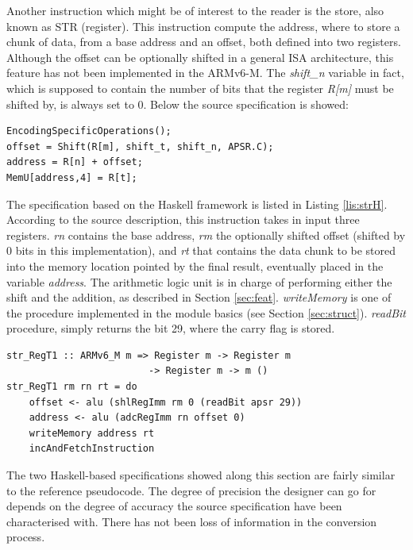 \documentclass[conference]{IEEEtran}
\begin{document}
Another instruction which might be of interest to the reader is the store, also known as STR
(register). This instruction compute the address, where to store a chunk of data, from a base
address and an offset, both defined into two registers. Although the offset can be optionally
shifted in a general ISA architecture, this feature has not been implemented in the ARMv6-M.
The \textit{shift\_n} variable in fact, which is supposed to contain the number of bits that
the register \textit{R[m]} must be shifted by, is always set to 0. Below the source
specification is showed:\\

\begin{lstlisting}[caption=STR (register) instruction - Reference specification,
frame=single, label=lis:str]
EncodingSpecificOperations();
offset = Shift(R[m], shift_t, shift_n, APSR.C);
address = R[n] + offset;
MemU[address,4] = R[t];
\end{lstlisting}

\noindent
The specification based on the Haskell framework is listed in Listing \ref{lis:strH}.
According to the source description, this instruction takes in input three registers.
\textit{rn} contains the base address, \textit{rm} the optionally shifted offset (shifted by
0 bits in this implementation), and \textit{rt} that contains the data chunk to be stored
into the memory location pointed by the final result, eventually placed in the variable
\textit{address}. The arithmetic logic unit is in charge of performing either the shift and
the addition, as described in Section \ref{sec:feat}. \textit{writeMemory} is one of the
procedure implemented in the module basics (see Section \ref{sec:struct}). \textit{readBit}
procedure, simply returns the bit 29, where the carry flag is stored.\\

\begin{lstlisting}[caption=STR (register) instruction - Haskell-based specification,
frame=single, label=lis:strH]
str_RegT1 :: ARMv6_M m => Register m -> Register m
						 -> Register m -> m ()
str_RegT1 rm rn rt = do
    offset <- alu (shlRegImm rm 0 (readBit apsr 29))
    address <- alu (adcRegImm rn offset 0)
    writeMemory address rt
    incAndFetchInstruction
\end{lstlisting}

The two Haskell-based specifications showed along this section are fairly similar to the
reference pseudocode. The degree of precision the designer can go for depends on the degree
of accuracy the source specification have been characterised with. There has not been loss of
information in the conversion process.
\end{document}
